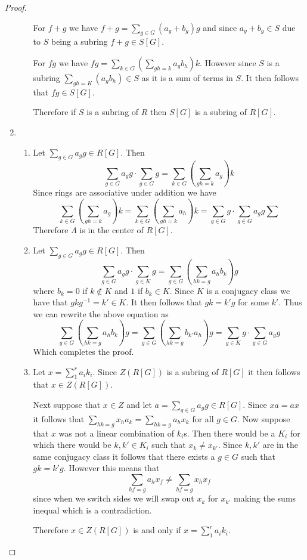 \documentclass[10pt]{article}
\theoremstyle{plain}
\theoremstyle{remark}
\begin{document}
\begin{proof}
\begin{enumerate}
\begin{enumerate}
      For $f+g$ we have $f+g=\sum_{g\in G}(a_g+b_g)g$ and since $a_g+b_g\in S$ due to
      $S$ being a subring $f+g\in S[G]$.

      For $fg$ we have $fg=\sum_{k\in G}\left(\sum_{gh=k}a_gb_h\right)k$. However
      since $S$ is a subring $\sum_{gh=K}(a_gb_h)\in S$ as it is a sum of terms in $S$.
      It then follows that $fg\in S[G]$.

      Therefore if $S$ is a subring of $R$ then $S[G]$ is a subring of $R[G]$.
    \end{enumerate}
  \item
    \begin{enumerate}
    \item Let $\sum_{g\in G}a_gg\in R[G]$. Then
      \[ \sum_{g\in G}a_gg\cdot\sum_{g\in G}g=\sum_{k\in G}\left(\sum_{gh=k}a_g\right)k \]
      Since rings are associative under addition we have
      \[ \sum_{k\in G}\left(\sum_{gh=k}a_g\right)k= \sum_{k\in G}\left(\sum_{gh=k}a_h\right)k
        = \sum_{g\in G}g\cdot\sum_{g\in G}a_gg\sum\]
      Therefore $\Lambda$ is in the center of $R[G]$.
    \item Let $\sum_{g\in G}a_gg\in R[G]$. Then
      \[ \sum_{g\in G}a_gg\cdot\sum_{g\in K}g=\sum_{g\in G}
        \left(
          \sum_{hk=g}a_hb_k
        \right)g\]
      where $b_k=0$ if $k\notin K$ and $1$ if $b_k\in K$. Since
      $K$ is a conjugacy class we have that
      $gkg^{-1}=k'\in K$. It then follows that $gk=k'g$ for some $k'$.
      Thus we can rewrite the above equation as
      \[ \sum_{g\in G}
        \left(
          \sum_{hk=g}a_hb_k
        \right)g
        =
        \sum_{g\in G}
        \left(
          \sum_{hk=g}b_{k'}a_h
        \right)g
        =
        \sum_{g\in K}g \cdot\sum_{g\in G}a_gg \]
      Which completes the proof.
    \item Let $x=\sum_1^ra_ik_i$. Since $Z(R[G])$ is a subring of $R[G]$ it then
      follows that $x\in Z(R[G])$.

      Next suppose that $x\in Z$ and let $a=\sum_{g\in G}a_gg\in R[G]$. Since
      $xa=ax$ it follows that $\sum_{hk=g}x_ha_k=\sum_{hk=g}a_hx_k$ for all $g\in G$.
      Now suppose that $x$ was not a linear combination of $k_i$s. Then
      there would be a $K_i$ for which there would be $k,k'\in K_i$ such that
      $x_k\neq x_{k'}$. Since $k,k'$ are in the same conjugacy class it follows
      that there exists a $g\in G$ such that $gk=k'g$. However this means that
      \[ \sum_{hf=g}a_hx_f\neq \sum_{hf=g} x_hx_f \]
      since when we switch sides we will swap out $x_k$ for $x_{k'}$ making the
      sums inequal which is a contradiction.

      Therefore $x\in Z(R[G])$ is and only if $x=\sum_1^ra_ik_i$.
    \end{enumerate}
  \end{enumerate}
\end{proof}
\end{document}
